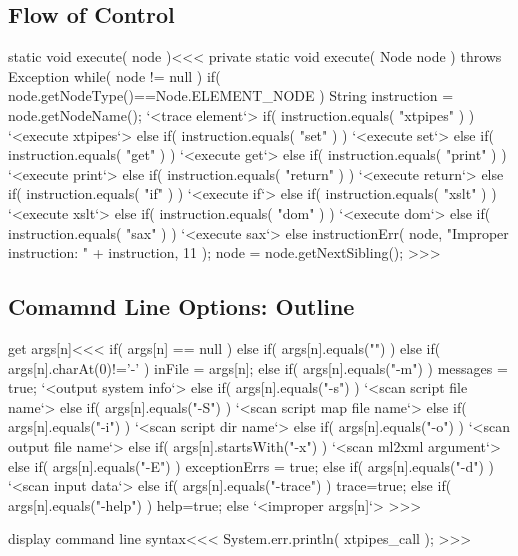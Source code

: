 \documentclass{article}
\begin{document}
{%
\subsection{Flow of Control}


\<static void execute( node )\><<<
private static void execute( Node node ) throws Exception {
  while( node != null ){
    if( node.getNodeType()==Node.ELEMENT_NODE ){
      String instruction = node.getNodeName();
      `<trace element`>
      if( instruction.equals( "xtpipes" ) ){
         `<execute xtpipes`>
      } else if( instruction.equals( "set" ) ){
         `<execute set`>
      } else if( instruction.equals( "get" ) ){
         `<execute get`>
      } else if( instruction.equals( "print" ) ){
         `<execute print`>
      } else if( instruction.equals( "return" ) ){
         `<execute return`>
      } else if( instruction.equals( "if" ) ){
         `<execute if`>
      } else if( instruction.equals( "xslt" ) ){
         `<execute xslt`>
      } else if( instruction.equals( "dom" ) ){
         `<execute dom`>
      } else if( instruction.equals( "sax" ) ){
         `<execute sax`>
      } else {
         instructionErr( node, "Improper instruction: " + instruction, 11 );
    } }
    node = node.getNextSibling();
} }
>>>



\subsection{Comamnd Line Options: Outline}



\<get args[n]\><<<
if( args[n] == null ){}
else if( args[n].equals("") ){}
else if( args[n].charAt(0)!='-' ){ inFile = args[n]; }
else if( args[n].equals("-m") ){
  messages = true;
  `<output system info`>
}
else if( args[n].equals("-s") ){
  `<scan script file name`>
}
else if( args[n].equals("-S") ){
  `<scan script map file name`>
}
else if( args[n].equals("-i") ){
  `<scan script dir name`>
}
else if( args[n].equals("-o") ){
  `<scan output file name`>
}
else if( args[n].startsWith("-x") ){
  `<scan ml2xml argument`>
}
else if( args[n].equals("-E") ){
  exceptionErrs = true;
}
else if( args[n].equals("-d") ){
  `<scan input data`>
}
else if( args[n].equals("-trace") ){ trace=true; }
else if( args[n].equals("-help") ){ help=true; }
else { `<improper args[n]`> }
>>>


\<display command line syntax\><<<
System.err.println( xtpipes_call );
>>>

}
\end{document}
